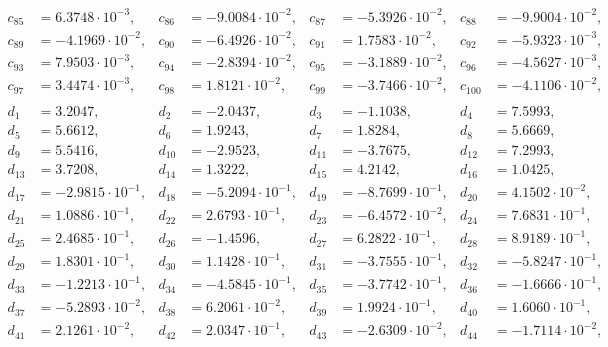 \begin{align*}
c_{ 85 } &= 6.3748 \cdot 10^{ -3 }, & c_{ 86 } &= -9.0084 \cdot 10^{ -2 }, & c_{ 87 } &= -5.3926 \cdot 10^{ -2 }, & c_{ 88 } &= -9.9004 \cdot 10^{ -2 },\\ 
c_{ 89 } &= -4.1969 \cdot 10^{ -2 }, & c_{ 90 } &= -6.4926 \cdot 10^{ -2 }, & c_{ 91 } &= 1.7583 \cdot 10^{ -2 }, & c_{ 92 } &= -5.9323 \cdot 10^{ -3 },\\ 
c_{ 93 } &= 7.9503 \cdot 10^{ -3 }, & c_{ 94 } &= -2.8394 \cdot 10^{ -2 }, & c_{ 95 } &= -3.1889 \cdot 10^{ -2 }, & c_{ 96 } &= -4.5627 \cdot 10^{ -3 },\\ 
c_{ 97 } &= 3.4474 \cdot 10^{ -3 }, & c_{ 98 } &= 1.8121 \cdot 10^{ -2 }, & c_{ 99 } &= -3.7466 \cdot 10^{ -2 }, & c_{ 100 } &= -4.1106 \cdot 10^{ -2 },\\ 
&&&&&&& \\ 
d_{ 1 } &= 3.2047, & d_{ 2 } &= -2.0437, & d_{ 3 } &= -1.1038, & d_{ 4 } &= 7.5993,\\ 
d_{ 5 } &= 5.6612, & d_{ 6 } &= 1.9243, & d_{ 7 } &= 1.8284, & d_{ 8 } &= 5.6669,\\ 
d_{ 9 } &= 5.5416, & d_{ 10 } &= -2.9523, & d_{ 11 } &= -3.7675, & d_{ 12 } &= 7.2993,\\ 
d_{ 13 } &= 3.7208, & d_{ 14 } &= 1.3222, & d_{ 15 } &= 4.2142, & d_{ 16 } &= 1.0425,\\ 
d_{ 17 } &= -2.9815 \cdot 10^{ -1 }, & d_{ 18 } &= -5.2094 \cdot 10^{ -1 }, & d_{ 19 } &= -8.7699 \cdot 10^{ -1 }, & d_{ 20 } &= 4.1502 \cdot 10^{ -2 },\\ 
d_{ 21 } &= 1.0886 \cdot 10^{ -1 }, & d_{ 22 } &= 2.6793 \cdot 10^{ -1 }, & d_{ 23 } &= -6.4572 \cdot 10^{ -2 }, & d_{ 24 } &= 7.6831 \cdot 10^{ -1 },\\ 
d_{ 25 } &= 2.4685 \cdot 10^{ -1 }, & d_{ 26 } &= -1.4596, & d_{ 27 } &= 6.2822 \cdot 10^{ -1 }, & d_{ 28 } &= 8.9189 \cdot 10^{ -1 },\\ 
d_{ 29 } &= 1.8301 \cdot 10^{ -1 }, & d_{ 30 } &= 1.1428 \cdot 10^{ -1 }, & d_{ 31 } &= -3.7555 \cdot 10^{ -1 }, & d_{ 32 } &= -5.8247 \cdot 10^{ -1 },\\ 
d_{ 33 } &= -1.2213 \cdot 10^{ -1 }, & d_{ 34 } &= -4.5845 \cdot 10^{ -1 }, & d_{ 35 } &= -3.7742 \cdot 10^{ -1 }, & d_{ 36 } &= -1.6666 \cdot 10^{ -1 },\\ 
d_{ 37 } &= -5.2893 \cdot 10^{ -2 }, & d_{ 38 } &= 6.2061 \cdot 10^{ -2 }, & d_{ 39 } &= 1.9924 \cdot 10^{ -1 }, & d_{ 40 } &= 1.6060 \cdot 10^{ -1 },\\ 
d_{ 41 } &= 2.1261 \cdot 10^{ -2 }, & d_{ 42 } &= 2.0347 \cdot 10^{ -1 }, & d_{ 43 } &= -2.6309 \cdot 10^{ -2 }, & d_{ 44 } &= -1.7114 \cdot 10^{ -2 },\\ 

\end{align*}

